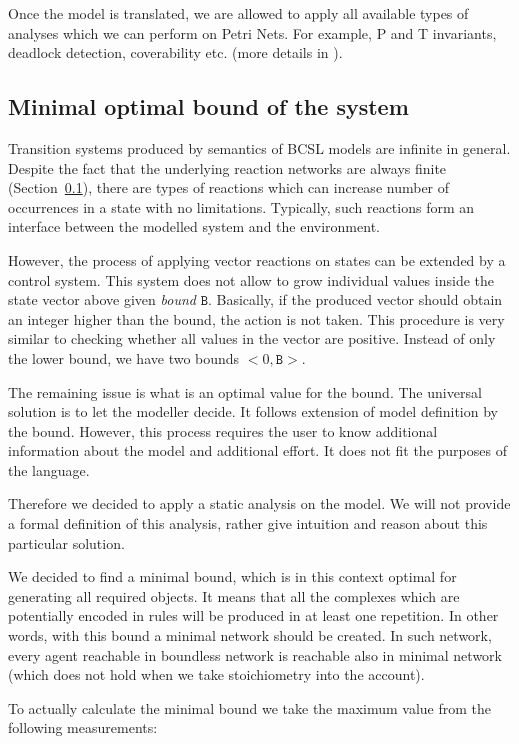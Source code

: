 \documentclass[12pt, twoside]{fithesis2} %
\begin{document}
Once the model is translated, we are allowed to apply all available types of analyses which we can perform on Petri Nets. For example, P and T invariants, deadlock detection, coverability etc. (more details in \cite{petri}).

\subsection{Minimal optimal bound of the system}
\label{optimal_bound}

Transition systems produced by semantics of BCSL models are infinite in general. Despite the fact that the underlying reaction networks are always finite (Section~\ref{optimal_bound}), there are types of reactions which can increase number of occurrences in a state with no limitations. Typically, such reactions form an interface between the modelled system and the environment.

However, the process of applying vector reactions on states can be extended by a control system. This system does not allow to grow individual values inside the state vector above given \emph{bound} $\mathtt{B}$. Basically, if the produced vector should obtain an integer higher than the bound, the action is not taken. This procedure is very similar to checking whether all values in the vector are positive. Instead of only the lower bound, we have two bounds $<0, \mathtt{B}>$.

The remaining issue is what is an optimal value for the bound. The universal solution is to let the modeller decide. It follows extension of model definition by the bound. However, this process requires the user to know additional information about the model and additional effort. It does not fit the purposes of the language.

Therefore we decided to apply a static analysis on the model. We will not provide a formal definition of this analysis, rather give intuition and reason about this particular solution.

We decided to find a minimal bound, which is in this context optimal for generating all required objects. It means that all the complexes which are potentially encoded in rules will be produced in at least one repetition. In other words, with this bound a minimal network should be created. In such network, every agent reachable in boundless network is reachable also in minimal network (which does not hold when we take stoichiometry into the account).

To actually calculate the minimal bound we take the maximum value from the following measurements:
\end{document}
